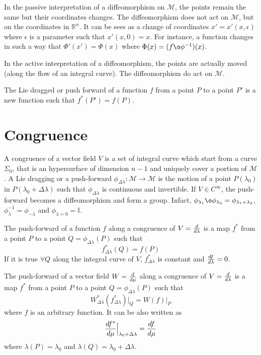     In the passive interpretation of a diffeomorphism on $\mathcal M$, the points remain the same but their coordinates changes. The diffeomorphism does not act on $\mathcal M$, but on the coordinates in $\mathbb R^n$. It can be sees as a change of coordinates $x' = x'(x, \epsilon)$ where $\epsilon$ is a parameter such that $x'(x, 0) = x$. For instance, a function changes in such a way that $\Phi'(x') = \Phi(x)$ where $\Phi(x) = (f \o \phi^{-1})(x)$.

    In the active interpretation of a diffeomorphism, the points are actually moved (along the flow of an integral curve). The diffeomorphism do act on $\mathcal M$. 

    The Lie dragged or push forward of a function $f$ from a point $P$ to a point $P'$ is a new function such that $f^*(P') = f(P)$. 

\section{Congruence}

    A congruence of a vector field $V$ is a set of integral curve which start from a curve $\Sigma_0$, that is an hypersurface of dimension $n-1$ and uniquely cover a portion of $\mathcal M$. A Lie dragging or a push-forward $\phi_{\Delta \lambda} \colon \mathcal M \rightarrow \mathcal M$ is the motion of a point $P(\lambda_0)$ in $P(\lambda_0 + \Delta \lambda)$ such that $\phi_{\Delta \lambda}$ is continuous and invertible. If $V \in C^{\infty}$, the push-forward becomes a diffeomorphism and form a group. Infact, $\phi_{\lambda_1} \o \phi_{\lambda_2} = \phi_{\lambda_1 + \lambda_2}$, $\phi_{\lambda}^{-1} = \phi_{- \lambda}$ and $\phi_{\lambda = 0} = \mathbb I$. 

    The push-forward of a function $f$ along a congruence of $V = \frac{d}{d\lambda}$ is a map $f^*$ from a point $P$ to a point $Q = \phi_{\Delta \lambda}(P) $ such that
    \begin{equation*}
        f^*_{\Delta \lambda} (Q) = f(P) 
    \end{equation*}
    If it is true $\forall Q$ along the integral curve of $V$, $f^*_{\Delta \lambda}$ is constant and $\frac{df}{d\lambda} = 0$.

    The push-forward of a vector field $W = \frac{d}{d\mu}$ along a congruence of $V = \frac{d}{d\lambda}$ is a map $f^*$ from a point $P$ to a point $Q = \phi_{\Delta \lambda}(P) $ such that
    \begin{equation*}
        W^*_{\Delta \lambda} (f^*_{\Delta \lambda}) \vert_Q = W (f) \vert_P
    \end{equation*}
    where $f$ is an arbitrary function. It can be also written as 
    \begin{equation*}
        \frac{df^*}{d\mu} \Big\vert_{\lambda_0 + \Delta \lambda} = \frac{df}{d\mu}
    \end{equation*}
    where $\lambda(P) = \lambda_0$ and $\lambda(Q) = \lambda_0 + \Delta \lambda$.
    

